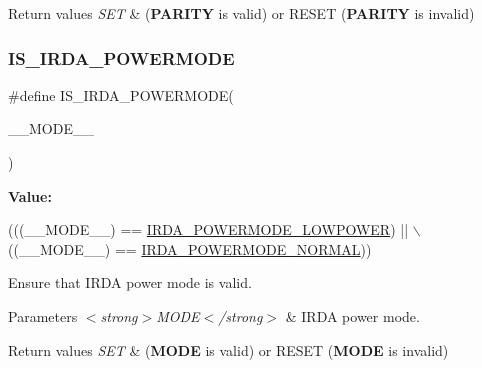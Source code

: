 \begin{DoxyRetVals}{Return values}
{\em S\+ET} & ({\bfseries P\+A\+R\+I\+TY} is valid) or R\+E\+S\+ET ({\bfseries P\+A\+R\+I\+TY} is invalid) \\
\hline
\end{DoxyRetVals}
\mbox{\label{group___i_r_d_a___private___macros_ga62955831ac6c4b3cf603046f74ddd88d}} 
\subsubsection{\texorpdfstring{I\+S\+\_\+\+I\+R\+D\+A\+\_\+\+P\+O\+W\+E\+R\+M\+O\+DE}{IS\_IRDA\_POWERMODE}}
{\footnotesize\ttfamily \#define I\+S\+\_\+\+I\+R\+D\+A\+\_\+\+P\+O\+W\+E\+R\+M\+O\+DE(\begin{DoxyParamCaption}\item[{}]{\+\_\+\+\_\+\+M\+O\+D\+E\+\_\+\+\_\+ }\end{DoxyParamCaption})}

{\bfseries Value\+:}
\begin{DoxyCode}
(((\_\_MODE\_\_) == \hyperlink{group___i_r_d_a___low___power_ga261eafd053023b5935b50767058c804b}{IRDA\_POWERMODE\_LOWPOWER}) || \(\backslash\)
                                     ((\_\_MODE\_\_) == \hyperlink{group___i_r_d_a___low___power_ga28e06e6f6e185f066d492e2d3cdb7e89}{IRDA\_POWERMODE\_NORMAL}))
\end{DoxyCode}


Ensure that I\+R\+DA power mode is valid. 


\begin{DoxyParams}{Parameters}
{\em $<$strong$>$\+M\+O\+D\+E$<$/strong$>$} & I\+R\+DA power mode. \\
\hline
\end{DoxyParams}

\begin{DoxyRetVals}{Return values}
{\em S\+ET} & ({\bfseries M\+O\+DE} is valid) or R\+E\+S\+ET ({\bfseries M\+O\+DE} is invalid) \\
\hline
\end{DoxyRetVals}
\mbox{\label{group___i_r_d_a___private___macros_ga62a58f1171d6c619a18845e2a418853c}} 
